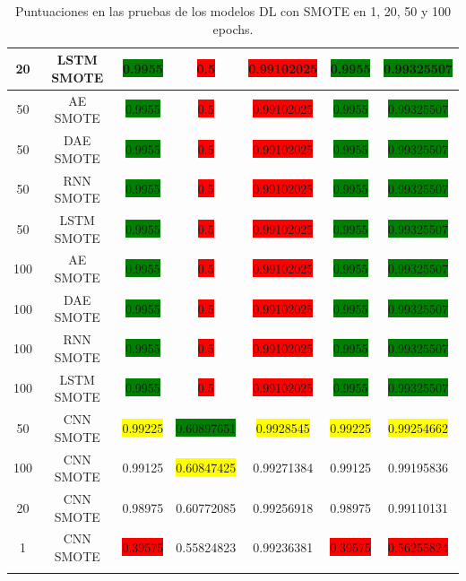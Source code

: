 \begin{longtable}{|c|c|c|c|c|c|c|}
	20 & LSTM SMOTE & \colorbox{green}{0.9955} & \colorbox{red}{0.5} & \colorbox{red}{0.99102025} & \colorbox{green}{0.9955} & \colorbox{green}{0.99325507}\\ \hline
	50 & AE SMOTE & \colorbox{green}{0.9955} & \colorbox{red}{0.5} & \colorbox{red}{0.99102025} & \colorbox{green}{0.9955} & \colorbox{green}{0.99325507}\\ \hline
	50 & DAE SMOTE & \colorbox{green}{0.9955} & \colorbox{red}{0.5} & \colorbox{red}{0.99102025} & \colorbox{green}{0.9955} & \colorbox{green}{0.99325507}\\ \hline
	50 & RNN SMOTE & \colorbox{green}{0.9955} & \colorbox{red}{0.5} & \colorbox{red}{0.99102025} & \colorbox{green}{0.9955} & \colorbox{green}{0.99325507}\\ \hline
	50 & LSTM SMOTE & \colorbox{green}{0.9955} & \colorbox{red}{0.5} & \colorbox{red}{0.99102025} & \colorbox{green}{0.9955} & \colorbox{green}{0.99325507}\\ \hline
	100 & AE SMOTE & \colorbox{green}{0.9955} & \colorbox{red}{0.5} & \colorbox{red}{0.99102025} & \colorbox{green}{0.9955} & \colorbox{green}{0.99325507}\\ \hline
	100 & DAE SMOTE & \colorbox{green}{0.9955} & \colorbox{red}{0.5} & \colorbox{red}{0.99102025} & \colorbox{green}{0.9955} & \colorbox{green}{0.99325507}\\ \hline
	100 & RNN SMOTE & \colorbox{green}{0.9955} & \colorbox{red}{0.5} & \colorbox{red}{0.99102025} & \colorbox{green}{0.9955} & \colorbox{green}{0.99325507}\\ \hline
	100 & LSTM SMOTE & \colorbox{green}{0.9955} & \colorbox{red}{0.5} & \colorbox{red}{0.99102025} & \colorbox{green}{0.9955} & \colorbox{green}{0.99325507}\\ \hline
	50 & CNN SMOTE & \colorbox{yellow}{0.99225} & \colorbox{green}{0.60897651} & \colorbox{yellow}{0.9928545} & \colorbox{yellow}{0.99225} & \colorbox{yellow}{0.99254662}\\ \hline
	100 & CNN SMOTE & 0.99125 & \colorbox{yellow}{0.60847425} & 0.99271384 & 0.99125 & 0.99195836\\ \hline
	20 & CNN SMOTE & 0.98975 & 0.60772085 & 0.99256918 & 0.98975 & 0.99110131\\ \hline
	1 & CNN SMOTE & \colorbox{red}{0.39575} & 0.55824823 & 0.99236381 & \colorbox{red}{0.39575} & \colorbox{red}{0.56255824}\\ \hline
	\caption{Puntuaciones en las pruebas de los modelos DL con SMOTE en 1, 20, 50 y 100 epochs.}
	\label{t:7}
\end{longtable}

